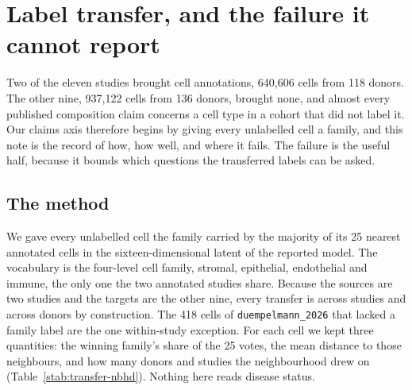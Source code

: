 %
%

\section{Label transfer, and the failure it cannot report}
\label{note:transfer}

Two of the eleven studies brought cell annotations, 640{,}606 cells from
118 donors. The other nine, 937{,}122 cells from 136 donors, brought none,
and almost every published composition claim concerns a cell type in a
cohort that did not label it. Our claims axis therefore begins by giving
every unlabelled cell a family, and this note is the record of how, how
well, and where it fails. The failure is the useful half, because it bounds
which questions the transferred labels can be asked.

\subsection{The method}

We gave every unlabelled cell the family carried by the majority of its 25
nearest annotated cells in the sixteen-dimensional latent of the reported
model. The vocabulary is the four-level cell family, stromal, epithelial,
endothelial and immune, the only one the two annotated studies share.
Because the sources are two studies and the targets are the other nine,
every transfer is across studies and across donors by construction. The 418
cells of \texttt{duempelmann\_2026} that lacked a family label are the one
within-study exception. For each cell we kept three quantities: the winning
family's share of the 25 votes, the mean distance to those neighbours, and
how many donors and studies the neighbourhood drew on
(Table~\ref{stab:transfer-nbhd}). Nothing here reads disease status.

